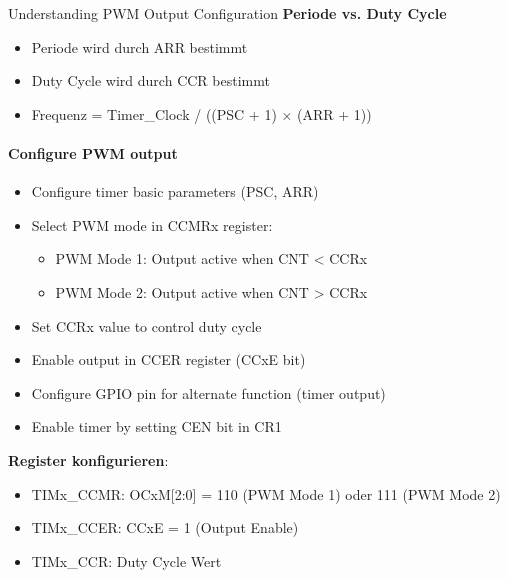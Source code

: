 \begin{concept}{Understanding PWM Output Configuration}
\textbf{Periode vs. Duty Cycle}
    \begin{itemize}
        \item Periode wird durch ARR bestimmt
        \item Duty Cycle wird durch CCR bestimmt
        \item Frequenz = Timer\_Clock / ((PSC + 1) $\times$ (ARR + 1))
    \end{itemize}

\paragraph{Configure PWM output}
\begin{itemize}
    \item Configure timer basic parameters (PSC, ARR)
    \item Select PWM mode in CCMRx register:
    \begin{itemize}
        \item PWM Mode 1: Output active when CNT < CCRx
        \item PWM Mode 2: Output active when CNT > CCRx
    \end{itemize}
    \item Set CCRx value to control duty cycle
    \item Enable output in CCER register (CCxE bit)
    \item Configure GPIO pin for alternate function (timer output)
    \item Enable timer by setting CEN bit in CR1
\end{itemize}
\textbf{Register konfigurieren}:
    \begin{itemize}
        \item TIMx\_CCMR: OCxM[2:0] = 110 (PWM Mode 1) oder 111 (PWM Mode 2)
        \item TIMx\_CCER: CCxE = 1 (Output Enable)
        \item TIMx\_CCR: Duty Cycle Wert
    \end{itemize}
\end{concept}


